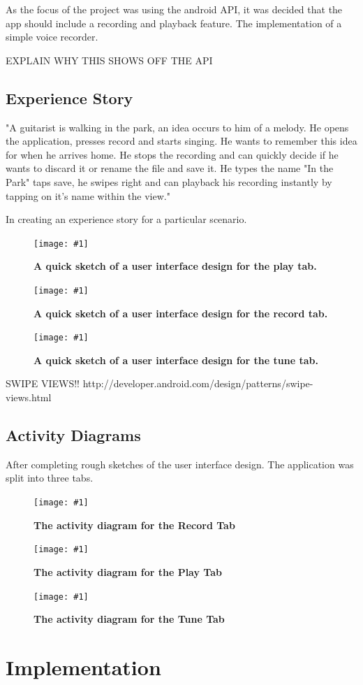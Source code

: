 \documentclass[conference]{acmsiggraph}
\newcommand{\figuremacroF}[3]{
	\begin{figure}[H] %
		\centering
		\texttt{[image: \#1]}
		\caption[#2]{\textbf{#2}}
		\label{fig:#1}
	\end{figure}
}
\begin{document}

As the focus of the project was using the android API, it was decided that the app should include a recording and playback feature. The implementation of a simple voice recorder. %

EXPLAIN WHY THIS SHOWS OFF THE API


\subsection{Experience Story}

"A guitarist is walking in the park, an idea occurs to him of a melody. He opens the application, presses record and starts singing. He wants to remember this idea for when he arrives home. He stops the recording and can quickly decide if he wants to discard it or rename the file and save it. He types the name "In the Park" taps save, he swipes right and can playback his recording instantly by tapping on it's name within the view." 

In creating an experience story for a particular scenario. %

\figuremacroF
{playSketch}
{A quick sketch of a user interface design for the play tab.}
{1.0}

\figuremacroF
{recordSketch}
{A quick sketch of a user interface design for the record tab.}
{1.0}

\figuremacroF
{tuneSketch}
{A quick sketch of a user interface design for the tune tab.}
{1.0}

SWIPE VIEWS!!
http://developer.android.com/design/patterns/swipe-views.html

\subsection{Activity Diagrams}

After completing rough sketches of the user interface design. The application was split into three tabs. 

\figuremacroF
{RecordTab}
{The activity diagram for the Record Tab}
{1.0}

\figuremacroF
{PlayTab}
{The activity diagram for the Play Tab}
{1.0}

\figuremacroF
{TuneTab}
{The activity diagram for the Tune Tab}
{1.0}
 
\section{Implementation}
\end{document}
